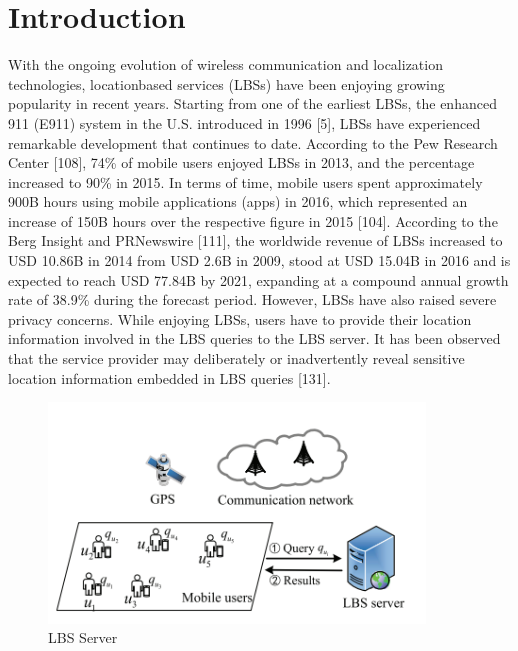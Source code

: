 \documentclass{opticajnl}
\begin{document}
\tableofcontents
\newpage
\section{Introduction}
With the ongoing evolution of wireless communication and localization technologies, locationbased services (LBSs) have been enjoying growing popularity in recent years. Starting from one of the earliest LBSs, the enhanced 911 (E911) system in the U.S. introduced in 1996 [5], LBSs have experienced remarkable development that continues to date. According to the Pew Research Center [108], 74\% of mobile users enjoyed LBSs in 2013, and the percentage increased to 90\% in 2015. In terms of time, mobile users spent approximately 900B hours using mobile applications (apps) in 2016, which represented an increase of 150B hours over the respective figure in 2015 [104]. According to the Berg Insight and PRNewswire [111], the worldwide revenue of LBSs increased to USD 10.86B in 2014 from USD 2.6B in 2009, stood at USD 15.04B in 2016 and is expected to reach USD 77.84B by 2021, expanding at a compound annual growth rate of 38.9\% during the forecast period. However, LBSs have also raised severe privacy concerns. While enjoying LBSs, users have to provide their location information involved in the LBS queries to the LBS server. It has been observed that the service provider may deliberately or inadvertently reveal sensitive location information embedded in LBS queries [131].
\begin{figure}[H]
    \centering
    \includegraphics[width=100mm]{LBS Server.png}
    \caption{LBS Server}
    \label{1}
\end{figure}
\end{document}
